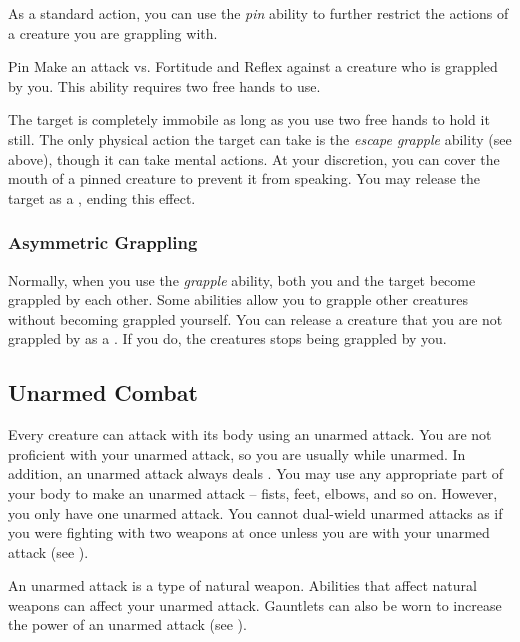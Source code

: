              As a standard action, you can use the \textit{pin} ability to further restrict the actions of a creature you are grappling with.

            \begin{freeability}{Pin}
                Make an attack vs. Fortitude and Reflex against a creature who is grappled by you.
                This ability requires two free hands to use.

                \hit The target is completely immobile as long as you use two free hands to hold it still.
                The only physical action the target can take is the \textit{escape grapple} ability (see above), though it can take mental actions.
                At your discretion, you can cover the mouth of a pinned creature to prevent it from speaking.
                You may release the target as a , ending this effect.
            \end{freeability}

        \subsubsection{Asymmetric Grappling}\label{Asymmetric Grappling}
            Normally, when you use the \textit{grapple} ability, both you and the target become grappled by each other.
            Some abilities allow you to grapple other creatures without becoming grappled yourself.
            You can release a creature that you are not grappled by as a .
            If you do, the creatures stops being grappled by you.

    \subsection{Unarmed Combat}\label{Unarmed Combat}
        Every creature can attack with its body using an unarmed attack.
        You are not proficient with your unarmed attack, so you are usually  while unarmed.
        In addition, an unarmed attack always deals .
        You may use any appropriate part of your body to make an unarmed attack -- fists, feet, elbows, and so on.
        However, you only have one unarmed attack.
        You cannot dual-wield unarmed attacks as if you were fighting with two weapons at once unless you are  with your unarmed attack (see ).

        An unarmed attack is a type of natural weapon.
        Abilities that affect natural weapons can affect your unarmed attack.
        Gauntlets can also be worn to increase the power of an unarmed attack (see ).

